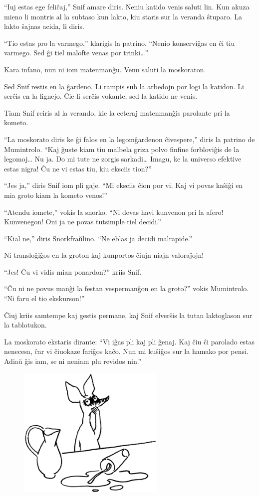 ``Iuj estas ege feliĉaj,'' Snif amare diris. Neniu katido venis saluti lin. Kun akuza mieno li montris al la subtaso kun lakto, kiu staris sur la veranda ŝtuparo. La lakto ŝajnas acida, li diris.

``Tio estas pro la varmego,'' klarigis la patrino. ``Nenio konserviĝas en ĉi tiu varmego. Sed ĝi tiel malofte venas por trinki{\ldots}''

Kara infano, nun ni iom matenmanĝu. Venu saluti la moskoraton.

Sed Snif restis en la ĝardeno. Li rampis sub la arbedojn por logi la katidon. Li serĉis en la lignejo. Ĉie li serĉis vokante, sed la katido ne venis.

Tiam Snif reiris al la verando, kie la ceteraj matenmanĝis parolante pri la kometo.

``La moskorato diris ke ĝi falos en la legomĝardenon ĉivespere,'' diris la patrino de Mumintrolo. ``Kaj ĝuste kiam tiu malbela griza polvo finfine forbloviĝis de la legomoj{\ldots} Nu ja. Do mi tute ne zorgis sarkadi{\ldots} Imagu, ke la universo efektive estas nigra! Ĉu ne vi estas tiu, kiu eksciis tion?''

``Jes ja,'' diris Snif iom pli gaje. ``Mi eksciis ĉion por vi. Kaj vi povas kaŝiĝi en mia groto kiam la kometo venos!''

``Atendu iomete,'' vokis la snorko. ``Ni devas havi kunvenon pri la afero! Kunvenegon! Oni ja ne povas tutsimple tiel decidi.''

``Kial ne,'' diris Snorkfraŭlino. ``Ne eblas ja decidi malrapide.''

Ni transloĝiĝos en la groton kaj kunportos ĉiujn niajn valoraĵojn!

``Jes! Ĉu vi vidis mian ponardon?'' kriis Snif.

``Ĉu ni ne povus manĝi la festan vespermanĝon en la groto?'' vokis Mumintrolo. ``Ni faru el tio ekskurson!''

Ĉiuj kriis samtempe kaj gestis permane, kaj Snif elverŝis la tutan laktoglason sur la tablotukon.

La moskorato ekstaris dirante: ``Vi iĝas pli kaj pli ĝenaj. Kaj ĉiu ĉi parolado estas nenecesa, ĉar vi ĉiuokaze fariĝos kaĉo. Nun mi kuŝiĝos sur la hamako por pensi. Adiaŭ ĝis iam, se ni neniam plu revidos nin.''

\begin{figure}[htbp]
\centering
\includegraphics[width=200pt,height=179pt]{9-3.png}
\caption{}
\label{9-3}
\end{figure}


